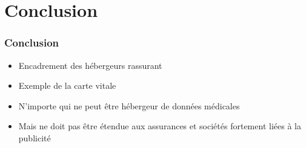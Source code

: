     \section{Conclusion}

\begin{frame}
\frametitle{Conclusion}
\begin{itemize}
    \itemsep2em
    \item Encadrement des hébergeurs rassurant
    \item Exemple de la carte vitale
    \item N'importe qui ne peut être hébergeur de données médicales
    \item Mais ne doit pas être étendue aux assurances et sociétés fortement
        liées à la publicité
\end{itemize}
\end{frame}

